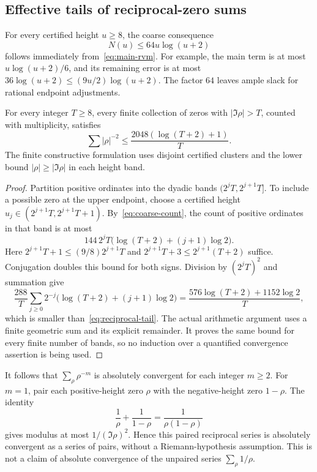 \subsection{Effective tails of reciprocal-zero sums}
\label{sec:zero-sums}

For every certified height $u\ge8$, the coarse consequence
\begin{equation}
                    N(u)\le64u\log(u+2)
 \label{eq:coarse-count}
\end{equation}
follows immediately from~\eqref{eq:main-rvm}. For example, the main
term is at most $u\log(u+2)/6$, and its remaining error is at most
$36\log(u+2)\le(9u/2)\log(u+2)$. The factor $64$ leaves ample
slack for rational endpoint adjustments.

\begin{theorem}
For every integer $T\ge8$, every finite collection of zeros with
$|\Im\rho|>T$, counted with multiplicity, satisfies
\begin{equation}
       \sum |\rho|^{-2}
       \le\frac{2048(\log(T+2)+1)}{T}.
 \label{eq:reciprocal-tail}
\end{equation}
The finite constructive formulation uses disjoint certified clusters
and the lower bound $|\rho|\ge|\Im\rho|$ in each height band.
\end{theorem}

\begin{proof}
Partition positive ordinates into the dyadic bands
$(2^jT,2^{j+1}T]$. To include a possible zero at the upper endpoint,
choose a certified height $u_j\in(2^{j+1}T,2^{j+1}T+1)$.
By~\eqref{eq:coarse-count}, the count of positive ordinates in that
band is at most
\[
 144\,2^jT\bigl(\log(T+2)+(j+1)\log2\bigr).
\]
Here $2^{j+1}T+1\le(9/8)2^{j+1}T$ and
$2^{j+1}T+3\le2^{j+1}(T+2)$ suffice. Conjugation doubles this
bound for both signs. Division by $(2^jT)^2$ and summation give
\[
 \frac{288}{T}\sum_{j\ge0}2^{-j}
       \bigl(\log(T+2)+(j+1)\log2\bigr)
 =\frac{576\log(T+2)+1152\log2}{T},
\]
which is smaller than~\eqref{eq:reciprocal-tail}.
The actual arithmetic argument uses a finite geometric sum and its
explicit remainder. It proves the same bound for every finite number
of bands, so no induction over a quantified convergence assertion is
being used.
\end{proof}

It follows that $\sum_\rho\rho^{-m}$ is absolutely convergent for
each integer $m\ge2$. For $m=1$, pair each positive-height zero
$\rho$ with the negative-height zero $1-\rho$. The identity
\begin{equation}
 \frac1\rho+\frac1{1-\rho}
       =\frac1{\rho(1-\rho)}
 \label{eq:paired-reciprocals}
\end{equation}
gives modulus at most $1/(\Im\rho)^2$. Hence this paired reciprocal
series is absolutely convergent as a series of pairs, without a
Riemann-hypothesis assumption. This is not a claim of absolute
convergence of the unpaired series $\sum_\rho1/\rho$.

